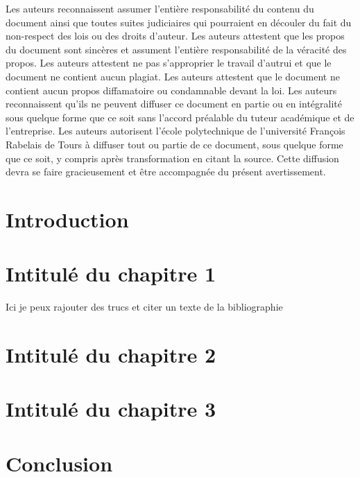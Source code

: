 \documentclass[12pt]{scrreprt} %
\begin{document}
Les auteurs reconnaissent assumer l’entière responsabilité du contenu du document ainsi que
toutes suites judiciaires qui pourraient en découler du fait du non-respect des lois ou des droits
d’auteur.
Les auteurs attestent que les propos du document sont sincères et assument l’entière responsabilité de la véracité des propos.
Les auteurs attestent ne pas s’approprier le travail d’autrui et que le document ne contient
aucun plagiat.
Les auteurs attestent que le document ne contient aucun propos diffamatoire ou condamnable
devant la loi.
Les auteurs reconnaissent qu’ils ne peuvent diffuser ce document en partie ou en intégralité
sous quelque forme que ce soit sans l’accord préalable du tuteur académique et de l’entreprise.
Les auteurs autorisent l’école polytechnique de l’université François Rabelais de Tours à diffuser tout ou partie de ce document, sous quelque forme que ce soit, y compris après transformation en citant la source. Cette diffusion devra se faire gracieusement et être accompagnée du présent avertissement.

\newpage
\renewcommand{\contentsname}{Table des matières} %
\tableofcontents


\newpage
\chapter*{Introduction}



\chapter{Intitulé du chapitre 1}

Ici je peux rajouter des trucs et citer un texte de la bibliographie\cite{greenwade93}
\chapter{Intitulé du chapitre 2}

\chapter{Intitulé du chapitre 3}


\chapter*{Conclusion}
\end{document}
